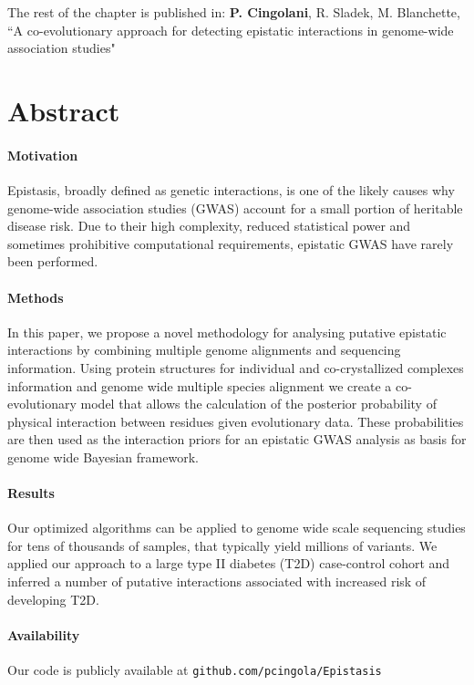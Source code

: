 The rest of the chapter is published in: \textbf{P. Cingolani}, R. Sladek, M. Blanchette, ``A co-evolutionary approach for detecting epistatic interactions in genome-wide association studies"

\section{Abstract}

\paragraph{Motivation} Epistasis, broadly defined as genetic interactions, is one of the likely causes why genome-wide association studies (GWAS) account for a small portion of heritable disease risk. Due to their high complexity, reduced statistical power and sometimes prohibitive computational requirements, epistatic GWAS have rarely been performed. 

\paragraph{Methods} In this paper, we propose a novel methodology for analysing putative epistatic interactions by combining multiple genome alignments and sequencing information. Using protein structures for individual and co-crystallized complexes information and genome wide multiple species alignment we create a co-evolutionary model that allows the calculation of the posterior probability of physical interaction between residues given evolutionary data. These probabilities are then used as the interaction priors for an epistatic GWAS analysis as basis for genome wide Bayesian framework. 

\paragraph{Results} Our optimized algorithms can be applied to genome wide scale sequencing studies for tens of thousands of samples, that typically yield millions of variants. We applied our approach to a large type II diabetes (T2D) case-control cohort and inferred a number of putative interactions associated with increased risk of developing T2D. 

\paragraph{Availability} Our code is publicly available at \texttt{github.com/pcingola/Epistasis}

